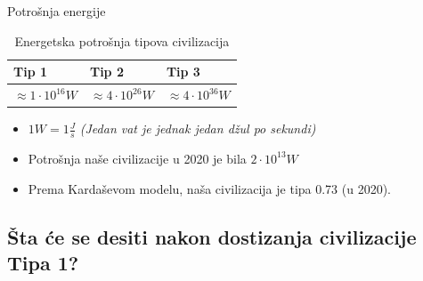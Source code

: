 \documentclass[13pt]{beamer}
\begin{document}
\begin{frame}{Potrošnja energije}

\renewcommand{\arraystretch}{1.5}
\begin{table}[]
    \centering
    \begin{tabular}{ |p{3cm}||p{3cm}|p{3cm}|  }
        \hline
        Tip 1& Tip 2 & Tip 3\\
        \hline
        $\approx 1 \cdot 10^{16} W$  & $\approx 4 \cdot 10^{26} W$ &$\approx 4 \cdot 10^{36} W$ \\
        \hline
    \end{tabular}
    \caption{Energetska potrošnja tipova civilizacija}
    \label{tab:my_label}
\end{table}

\begin{itemize}
    \item $1 W = 1\frac{J}{s}$ \textit{(Jedan vat je jednak jedan džul po sekundi)}
    \item Potrošnja naše civilizacije u 2020 je bila $2 \cdot 10^{13}W$
    \item Prema Kardaševom modelu, naša civilizacija je tipa 0.73 (u 2020).
\end{itemize}

\end{frame}

\subsection{Šta će se desiti nakon dostizanja civilizacije Tipa 1?}
\end{document}
